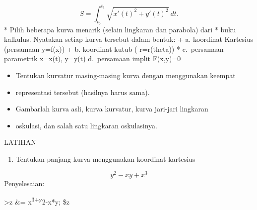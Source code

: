 \documentclass[
]{book}
\providecommand{\tightlist}{%
  \setlength{\itemsep}{0pt}\setlength{\parskip}{0pt}}
\begin{document}
\[S=\int_{t_0}^{t_1} \sqrt{x'(t)^2+y'(t)^2}\ dt.\]* Pilih beberapa kurva menarik (selain lingkaran dan parabola) dari * buku kalkulus. Nyatakan setiap kurva tersebut dalam bentuk: + a. koordinat Kartesius (persamaan y=f(x)) + b. koordinat kutub ( r=r(theta)) * c.~persamaan parametrik x=x(t), y=y(t) d.~persamaan implit F(x,y)=0

\begin{itemize}
\item
  Tentukan kurvatur masing-masing kurva dengan menggunakan keempat
\item
  representasi tersebut (hasilnya harus sama).
\item
  Gambarlah kurva asli, kurva kurvatur, kurva jari-jari lingkaran
\item
  oskulasi, dan salah satu lingkaran oskulasinya.
\end{itemize}

LATIHAN

\begin{enumerate}
\def\labelenumi{\arabic{enumi}.}
\tightlist
\item
  Tentukan panjang kurva menggunakan koordinat kartesius
\end{enumerate}

\[y^2-xy+x^3\]Penyelesaian:

\textgreater z \&= x\textsuperscript{3+y}2-x*y; \$z
\end{document}
